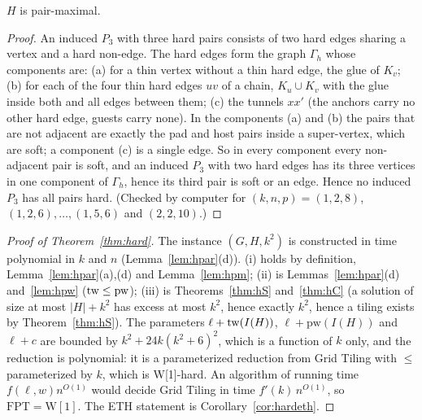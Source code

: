 \begin{lemma}\label{lem:hpm}
$H$ is pair-maximal.
\end{lemma}
\begin{proof}
An induced $P_3$ with three hard pairs consists of two hard edges sharing a vertex and a hard non-edge. The hard edges form the graph $\Gamma_h$ whose components are: (a) for a thin vertex without a thin hard edge, the glue of $K_v$; (b) for each of the four thin hard edges $uv$ of a chain, $K_u\cup K_v$ with the glue inside both and all edges between them; (c) the tunnels $xx'$ (the anchors carry no other hard edge, guests carry none). In the components (a) and (b) the pairs that are not adjacent are exactly the pad and host pairs inside a super-vertex, which are soft; a component (c) is a single edge. So in every component every non-adjacent pair is soft, and an induced $P_3$ with two hard edges has its three vertices in one component of $\Gamma_h$, hence its third pair is soft or an edge. Hence no induced $P_3$ has all pairs hard. (Checked by computer for $(k,n,p)=(1,2,8)$, $(1,2,6),\dots,(1,5,6)$ and $(2,2,10)$.)
\end{proof}

\begin{proof}[Proof of Theorem~\ref{thm:hard}]
The instance $(G,H,k^2)$ is constructed in time polynomial in $k$ and $n$ (Lemma~\ref{lem:hpar}(d)). (i) holds by definition, Lemma~\ref{lem:hpar}(a),(d) and Lemma~\ref{lem:hpm}; (ii) is Lemmas~\ref{lem:hpar}(d) and~\ref{lem:hpw} ($\mathrm{tw}\le\mathrm{pw}$); (iii) is Theorems~\ref{thm:hS} and~\ref{thm:hC} (a solution of size at most $|H|+k^2$ has excess at most $k^2$, hence exactly $k^2$, hence a tiling exists by Theorem~\ref{thm:hS}). The parameters $\ell+\mathrm{tw}(I(H))$, $\ell+\mathrm{pw}(I(H))$ and $\ell+c$ are bounded by $k^2+24k(k^2+6)^2$, which is a function of $k$ only, and the reduction is polynomial: it is a parameterized reduction from Grid Tiling with $\le$ parameterized by $k$, which is W[1]-hard. An algorithm of running time $f(\ell,w)n^{O(1)}$ would decide Grid Tiling in time $f'(k)\,n^{O(1)}$, so $\mathrm{FPT}=\mathrm{W[1]}$. The ETH statement is Corollary~\ref{cor:hardeth}.
\end{proof}


